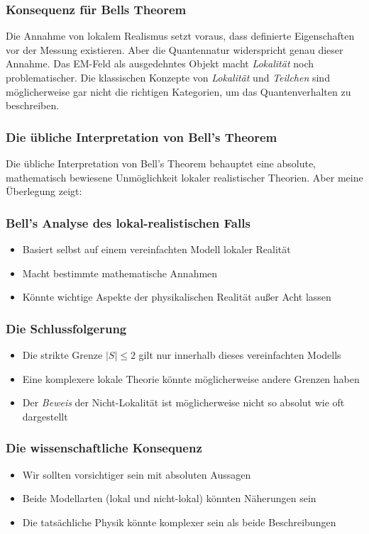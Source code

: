 \documentclass[12pt,a4paper]{article}
\begin{document}
	\subsubsection{Konsequenz für Bells Theorem}
	Die Annahme von lokalem Realismus setzt voraus, dass definierte Eigenschaften vor der Messung existieren. Aber die Quantennatur widerspricht genau dieser Annahme. Das EM-Feld als ausgedehntes Objekt macht \textit{Lokalität} noch problematischer. Die klassischen Konzepte von \textit{Lokalität} und \textit{Teilchen}  sind möglicherweise gar nicht die richtigen Kategorien, um das Quantenverhalten zu beschreiben.
	
	
	\subsubsection{Die übliche Interpretation von Bell's Theorem}
	
	Die übliche Interpretation von Bell's Theorem behauptet eine absolute, mathematisch bewiesene Unmöglichkeit lokaler realistischer Theorien. Aber meine Überlegung zeigt:
	
	\subsubsection{Bell's Analyse des lokal-realistischen Falls}
	\begin{itemize}
		\item Basiert selbst auf einem vereinfachten Modell lokaler Realität
		\item Macht bestimmte mathematische Annahmen
		\item Könnte wichtige Aspekte der physikalischen Realität außer Acht lassen
	\end{itemize}
	
	\subsubsection{Die Schlussfolgerung}
	\begin{itemize}
		\item Die strikte Grenze $|S| \leq 2$ gilt nur innerhalb dieses vereinfachten Modells
		\item Eine komplexere lokale Theorie könnte möglicherweise andere Grenzen haben
		\item Der \textit{Beweis} der Nicht-Lokalität ist möglicherweise nicht so absolut wie oft dargestellt
	\end{itemize}
	
	\subsubsection{Die wissenschaftliche Konsequenz}
	\begin{itemize}
		\item Wir sollten vorsichtiger sein mit absoluten Aussagen
		\item Beide Modellarten (lokal und nicht-lokal) könnten Näherungen sein
		\item Die tatsächliche Physik könnte komplexer sein als beide Beschreibungen
	\end{itemize}
	
\end{document}
